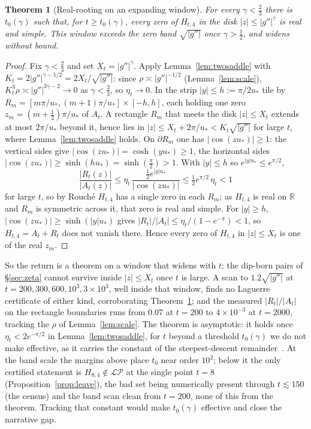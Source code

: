 \documentclass[11pt,reqno]{amsart}
\theoremstyle{plain}
\newtheorem{theorem}{Theorem}[section]
\theoremstyle{definition}
\theoremstyle{remark}
\newcommand{\R}{\mathbb R}
\newcommand{\LP}{\mathcal{LP}}
\begin{document}
\begin{theorem}[Real-rooting on an expanding window]\label{thm:window}
For every $\gamma<\tfrac23$ there is $t_0(\gamma)$ such that, for $t\ge t_0(\gamma)$,
every zero of $H_{t,4}$ in the disk $|z|\le|g''|^{\gamma}$ is real and simple. This
window exceeds the zero band $\sqrt{|g''|}$ once $\gamma>\tfrac12$, and widens
without bound.
\end{theorem}

\begin{proof}
Fix $\gamma<\tfrac23$ and set $X_t=|g''|^{\gamma}$. Apply Lemma~\ref{lem:twosaddle}
with $K_t=2|g''|^{\gamma-1/2}=2X_t/\sqrt{|g''|}$: since $\rho\asymp|g''|^{-1/2}$
(Lemma~\ref{lem:scale}), $K_t^3\rho\asymp|g''|^{3\gamma-2}\to0$ as $\gamma<\tfrac23$,
so $\eta_t\to0$. In the strip
$|y|\le h:=\pi/2u_*$ tile by $R_m=[m\pi/u_*,(m+1)\pi/u_*]\times[-h,h]$, each
holding one zero $z_m=(m+\tfrac12)\pi/u_*$ of $A_t$. A rectangle $R_m$ that meets
the disk $|z|\le X_t$ extends at most $2\pi/u_*$ beyond it, hence lies in
$|z|\le X_t+2\pi/u_*<K_t\sqrt{|g''|}$ for large $t$, where Lemma~\ref{lem:twosaddle}
holds. On $\partial R_m$ one has $|\cos(zu_*)|\ge1$:
the vertical sides give $|\cos(zu_*)|=\cosh(yu_*)\ge1$, the horizontal sides
$|\cos(zu_*)|\ge\sinh(hu_*)=\sinh(\tfrac\pi2)>1$. With $|y|\le h$ so
$e^{|y|u_*}\le e^{\pi/2}$,
\[
   \frac{|R_t(z)|}{|A_t(z)|}\le \eta_t\,\frac{\tfrac12 e^{|y|u_*}}{|\cos(zu_*)|}
   \le \tfrac12 e^{\pi/2}\,\eta_t<1
\]
for large $t$, so by Rouch\'e $H_{t,4}$ has a single zero in each $R_m$; as
$H_{t,4}$ is real on $\R$ and $R_m$ is symmetric across it, that zero is real and
simple. For $|y|\ge h$, $|\cos(zu_*)|\ge\sinh(|y|u_*)$ gives
$|R_t|/|A_t|\le\eta_t/(1-e^{-\pi})<1$, so $H_{t,4}=A_t+R_t$ does not vanish there.
Hence every zero of $H_{t,4}$ in $|z|\le X_t$ is one of the real $z_m$.
\end{proof}

So the return is a theorem on a window that widens with $t$: the dip-born pairs
of \S\ref{sec:zeta} cannot survive inside $|z|\le X_t$ once $t$ is large. A scan
to $1.2\sqrt{|g''|}$ at $t=200,300,600,10^3,3\times10^3$, well inside that window,
finds no Laguerre certificate of either kind, corroborating
Theorem~\ref{thm:window}; and the measured $|R_t|/|A_t|$ on the rectangle
boundaries runs from $0.07$ at $t=200$ to $4\times10^{-3}$ at $t=2000$, tracking
the $\rho$ of Lemma~\ref{lem:scale}. The theorem is asymptotic: it holds once
$\eta_t<2e^{-\pi/2}$ in Lemma~\ref{lem:twosaddle}, for $t$ beyond a threshold
$t_0(\gamma)$ we do not make effective, as it carries the constant of the
steepest-descent remainder~\cite{Olver}. At the band scale the margins above
place $t_0$ near order $10^2$; below it the only certified statement is $H_{8,4}\notin\LP$ at the
single point $t=8$ (Proposition~\ref{prop:leave}), the bad set being
numerically present through $t\lesssim150$ (the census) and the band scan clean
from $t=200$, none of this from the theorem.
Tracking that constant would make $t_0(\gamma)$ effective and close the narrative gap.
\end{document}
